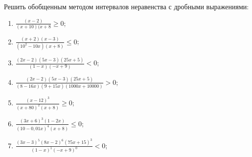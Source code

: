 \documentclass[algebra,a4paper]{pum}
\begin{document}
\begin{exercises}
\begin{multicols}{2}
 \begin{question}
  Решить обобщенным методом интервалов неравенства с дробными выражениями:
  \begin{enumerate}[itemsep=6pt]
  \item $\frac{(x-2)}{(x+10)(x+8}\ge0$;
  \item $\frac{(x+2)(x-3)}{(10^2-10x)(x+8)}\le0$;
  \item $\frac{(2x-2)(5x-3)(25x+5)}{(1-x)(-x+9)}<0$;
  \item $\frac{(2x-2)(5x-3)(25x+5)}{(8-16x)(9+15x)(1000x+10000)}>0$;
  \item $\frac{(x-12)^3}{(x+80)^2(x+8)}\ge0$;
  \item $\frac{(3x+6)^3(1-2x)}{(10-0,01x)^4(x+8)}\le0$;
  \item $\frac{(3x-3)^5(8x-2)^6(75x+15)^3}{(1-x)^1(-x+9)^0}<0$;
\end{enumerate}
\end{question}
\end{multicols}
\end{exercises}
\end{document}
